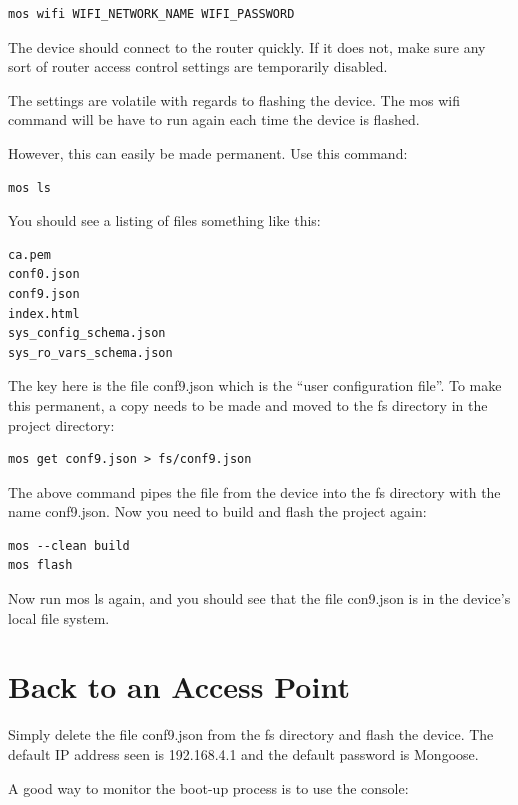 \documentclass[oneside,letterpaper,12pt]{book}
\begin{document}
\begin{verbatim}
mos wifi WIFI_NETWORK_NAME WIFI_PASSWORD
\end{verbatim}

The device should connect to the router quickly. If it does not, make
sure any sort of router access control settings are temporarily
disabled.

The settings are volatile with regards to flashing the device. The mos
wifi command will be have to run again each time the device is flashed.

However, this can easily be made permanent. Use this command:

\begin{verbatim}
mos ls
\end{verbatim}

You should see a listing of files something like this:

\begin{verbatim}
ca.pem
conf0.json
conf9.json
index.html
sys_config_schema.json
sys_ro_vars_schema.json
\end{verbatim}

The key here is the file conf9.json which is the ``user configuration
file''. To make this permanent, a copy needs to be made and moved to the
fs directory in the project directory:

\begin{verbatim}
mos get conf9.json > fs/conf9.json
\end{verbatim}

The above command pipes the file from the device into the fs directory
with the name conf9.json. Now you need to build and flash the project
again:

\begin{verbatim}
mos --clean build
mos flash
\end{verbatim}

Now run mos ls again, and you should see that the file con9.json is in
the device's local file system.

\section{Back to an Access Point}\label{back-to-an-access-point}

Simply delete the file conf9.json from the fs directory and flash the
device. The default IP address seen is 192.168.4.1 and the default
password is Mongoose.

A good way to monitor the boot-up process is to use the console:
\end{document}
